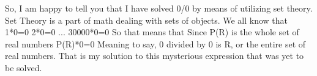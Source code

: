 \documentclass[12pt]{article}
\begin{document}
So, I am happy to tell you that I have solved 0/0 by means of utilizing set theory.
Set Theory is a part of math dealing with sets of objects.
We all know that 
1*0=0
2*0=0
...
30000*0=0
So that means that
Since P(R) is the whole set of real numbers
P(R)*0=0
Meaning to say, 0 divided by 0 is R, or the entire set of real numbers.
That is my solution to this mysterious expression that was yet to be solved.
\end{document}
